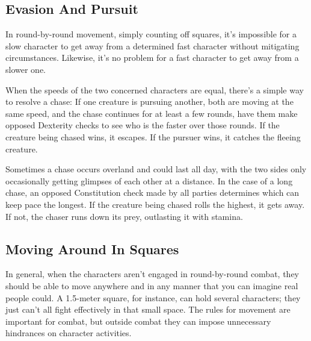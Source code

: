 \subsection{Evasion And Pursuit}
In round-by-round movement, simply counting off squares, it's impossible for a slow character to get away from a determined fast character without mitigating circumstances. Likewise, it's no problem for a fast character to get away from a slower one.

When the speeds of the two concerned characters are equal, there's a simple way to resolve a chase: If one creature is pursuing another, both are moving at the same speed, and the chase continues for at least a few rounds, have them make opposed Dexterity checks to see who is the faster over those rounds. If the creature being chased wins, it escapes. If the pursuer wins, it catches the fleeing creature.

Sometimes a chase occurs overland and could last all day, with the two sides only occasionally getting glimpses of each other at a distance. In the case of a long chase, an opposed Constitution check made by all parties determines which can keep pace the longest. If the creature being chased rolls the highest, it gets away. If not, the chaser runs down its prey, outlasting it with stamina.

\subsection{Moving Around In Squares}
In general, when the characters aren't engaged in round-by-round combat, they should be able to move anywhere and in any manner that you can imagine real people could. A 1.5-meter square, for instance, can hold several characters; they just can't all fight effectively in that small space. The rules for movement are important for combat, but outside combat they can impose unnecessary hindrances on character activities.




